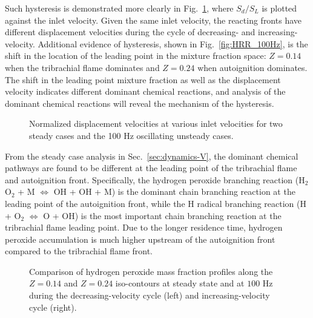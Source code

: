 Such hysteresis is demonstrated more clearly in Fig.~\ref{fig:sd_hys}, where $S_d/S_L$ is plotted against the inlet velocity.  Given the same inlet velocity, the reacting fronts have different displacement velocities during the cycle of decreasing- and increasing-velocity.  Additional evidence of hysteresis, shown in Fig.~\ref{fig:HRR_100Hz}, is the shift in the location of the leading point in the mixture fraction space: $Z = 0.14$ when the tribrachial flame dominates and $Z = 0.24$ when autoignition dominates.  The shift in the leading point mixture fraction as well as the displacement velocity indicates different dominant chemical reactions, and analysis of the dominant chemical reactions will reveal the mechanism of the hysteresis.

\begin{figure}[t]
  \centering
  \scriptsize
  \resizebox{1.0\textwidth}{!}{}
  \normalsize
  \caption{Normalized displacement velocities at various inlet velocities for two steady cases and the 100 Hz oscillating unsteady cases.}
  \label{fig:sd_hys}
\end{figure}

From the steady case analysis in Sec.~\ref{sec:dynamics-V}, the dominant chemical pathways are found to be different at the leading point of the tribrachial flame and autoignition front.  Specifically, the hydrogen peroxide branching reaction (H$_2$O$_2$ + M $\Longleftrightarrow$ OH + OH + M) is the dominant chain branching reaction at the leading point of the autoignition front, while the H radical branching reaction (H + O$_2$ $\Longleftrightarrow$ O + OH) is the most important chain branching reaction at the tribrachial flame leading point.  Due to the longer residence time, hydrogen peroxide accumulation is much higher upstream of the autoignition front compared to the tribrachial flame front.

\begin{figure}[t]
  \centering
  \scriptsize
  \resizebox{0.49\textwidth}{!}{}
  \resizebox{0.49\textwidth}{!}{}
  \resizebox{0.49\textwidth}{!}{}
  \resizebox{0.49\textwidth}{!}{}
  \normalsize
  \caption{Comparison of hydrogen peroxide mass fraction profiles along the $Z = 0.14$ and $Z = 0.24$ iso-contours at steady state and at $100$ Hz during the decreasing-velocity cycle (left) and increasing-velocity cycle (right).}
  \label{fig:H2O2_updown}
\end{figure}


